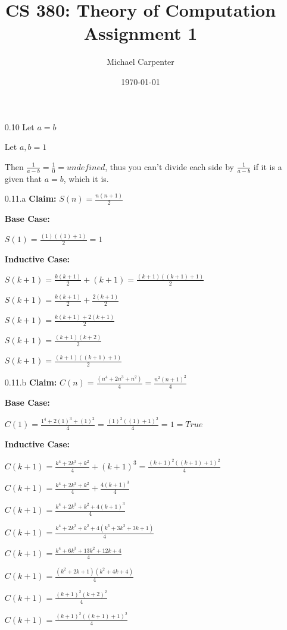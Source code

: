 \documentclass{article}
\title{CS 380: Theory of Computation \\ Assignment 1}
\author{Michael Carpenter}
\date{\today}
\begin{document}
\maketitle

\begin{itemize}
  \item[0.10] Let $a = b$

              Let $a,b = 1$

              Then $\frac{1}{a-b} = \frac{1}{0} = undefined$, thus you can't divide each side by $\frac{1}{a-b}$ if it is a given that $a=b$, which it is.
  \item[0.11.a]
    \textbf{Claim:} $S(n) = \frac{n(n+1)}{2}$

    \textbf{Base Case:}

    $S(1) = \frac{(1)((1)+1)}{2} = 1$

    \textbf{Inductive Case:}

    $S(k+1) = \frac{k(k+1)}{2} + (k+1) = \frac{(k+1)((k+1)+1)}{2}$

    $S(k+1) = \frac{k(k+1)}{2} + \frac{2(k+1)}{2}$

    $S(k+1) = \frac{k(k+1) + 2(k+1)}{2}$

    $S(k+1) = \frac{(k+1)(k+2)}{2}$

    $S(k+1) = \frac{(k+1)((k+1)+1)}{2}$

  \item[0.11.b]
    \textbf{Claim:} $C(n) = \frac{(n^4 + 2n^3 + n^2)}{4} = \frac{n^2(n+1)^2}{4}$

    \textbf{Base Case:}

    $C(1) = \frac{1^4 + 2(1)^3 + (1)^2}{4} = \frac{(1)^2((1)+1)^2}{4} = 1 = True$

    \textbf{Inductive Case:}

    $C(k+1) = \frac{k^4 + 2k^3 + k^2}{4} + (k+1)^3 = \frac{(k+1)^2((k+1)+1)^2}{4}$

    $C(k+1) = \frac{k^4 + 2k^3 + k^2}{4} + \frac{4(k+1)^3}{4}$

    $C(k+1) = \frac{k^4 + 2k^3 + k^2 + 4(k+1)^3}{4}$

    $C(k+1) = \frac{k^4 + 2k^3 + k^2 + 4(k^3 + 3k^2 + 3k + 1)}{4}$

    $C(k+1) = \frac{k^4 + 6k^3 + 13k^2 + 12k + 4}{4}$

    $C(k+1) = \frac{(k^2 + 2k + 1)(k^2 + 4k + 4)}{4}$

    $C(k+1) = \frac{(k+1)^2(k+2)^2}{4}$

    $C(k+1) = \frac{(k+1)^2((k+1)+1)^2}{4}$


\end{itemize}
\end{document}
